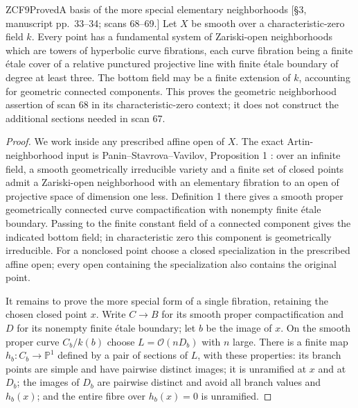 \begin{result}{ZCF9}{Proved}{A basis of the more special elementary neighborhoods}
\textup{[\S3, manuscript pp.\ 33--34; scans 68--69.]}
Let $X$ be smooth over a characteristic-zero field $k$. Every point
has a fundamental system of Zariski-open neighborhoods which are
towers of hyperbolic curve fibrations, each curve fibration being
a finite \'etale cover of a relative punctured projective line
with finite \'etale boundary of degree at least three. The bottom
field may be a finite extension of $k$, accounting for geometric
connected components. This proves the geometric neighborhood
assertion of scan 68 in its characteristic-zero context; it does
not construct the additional sections needed in scan 67.
\end{result}
\begin{proof}
We work inside any prescribed affine open of $X$. The exact
Artin-neighborhood input is Panin--Stavrova--Vavilov, Proposition 1
\cite{CF_PSV2009}: over an infinite field, a smooth geometrically
irreducible variety and a finite set of closed points admit a
Zariski-open neighborhood with an elementary fibration to an open
of projective space of dimension one less. Definition 1 there
gives a smooth proper geometrically connected curve compactification
with nonempty finite \'etale boundary. Passing to the finite
constant field of a connected component gives the indicated bottom
field; in characteristic zero this component is geometrically
irreducible. For a nonclosed point choose a closed specialization
in the prescribed affine open; every open containing the
specialization also contains the original point.

It remains to prove the more special form of a single fibration,
retaining the chosen closed point $x$. Write
$C\to B$ for its smooth proper compactification and $D$ for its
nonempty finite \'etale boundary; let $b$ be the image of $x$.
On the smooth proper curve $C_b/k(b)$ choose $L=\mathcal O(nD_b)$
with $n$ large. There is a finite map $h_b:C_b\to\mathbb P^1$
defined by a pair of sections of $L$, with these properties:
its branch points are simple and have pairwise distinct images;
it is unramified at $x$ and at $D_b$; the images of $D_b$ are
pairwise distinct and avoid all branch values and $h_b(x)$;
and the entire fibre over $h_b(x)=0$ is unramified.


\end{proof}
